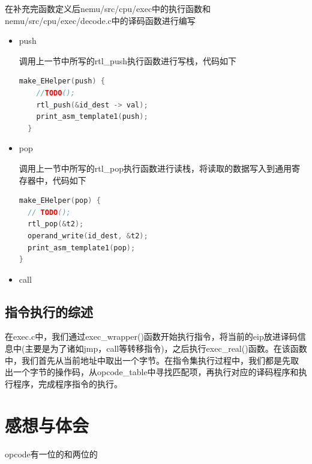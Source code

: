 \documentclass[UTF8,a4paper,10pt]{ctexart}
\begin{document}
在补充完函数定义后nemu/src/cpu/exec中的执行函数和nemu/src/cpu/exec/decode.c中的译码函数进行编写
\begin{itemize}
  \item push
  
  调用上一节中所写的rtl\_push执行函数进行写栈，代码如下
  \begin{lstlisting}[language = C]
  make_EHelper(push) {
    //TODO();
    rtl_push(&id_dest -> val);
    print_asm_template1(push); 
  }
  \end{lstlisting}
  \item pop
  
  调用上一节中所写的rtl\_pop执行函数进行读栈，将读取的数据写入到通用寄存器中，代码如下
  \begin{lstlisting}[language = C]
make_EHelper(pop) {
  // TODO();
  rtl_pop(&t2);
  operand_write(id_dest, &t2);
  print_asm_template1(pop);
}
\end{lstlisting}
  
\item call



\end{itemize}

\subsection{指令执行的综述}
在exec.c中，我们通过exec\_wrapper()函数开始执行指令，将当前的eip放进译码信息中(主要是为了诸如jmp，call等转移指令)，之后执行exec\_real()函数。在该函数中，我们首先从当前地址中取出一个字节。在指令集执行过程中，我们都是先取 出一个字节的操作码，从opcode\_table中寻找匹配项，再执行对应的译码程序和执行程序，完成程序指令的执行。

\section{感想与体会}
opcode有一位的和两位的
\end{document}
